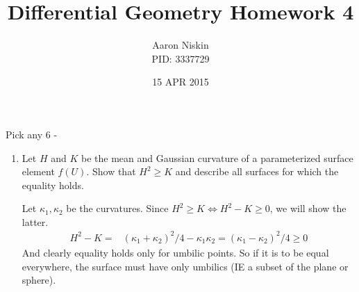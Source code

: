 \documentclass[12pt]{amsart}
\newcommand{\ka}[0]{\kappa}
\begin{document}
\title{Differential Geometry Homework 4}
\author{Aaron Niskin \\PID: 3337729}
\date{15 APR 2015}
\maketitle
Pick any 6 - 
\begin{enumerate}
	\item Let $H$ and $K$ be the mean and Gaussian curvature of a parameterized surface element $f(U)$. Show that $H^2\geq K$ and describe all surfaces for which the equality holds.

	Let $\ka_1,\ka_2$ be the curvatures. Since $H^2\geq K\iff H^2-K\geq0$, we will show the latter.
	\begin{align*}
		H^2-K=&(\ka_1+\ka_2)^2/4-\ka_1\ka_2=(\ka_1-\ka_2)^2/4\geq0
	\end{align*}
	And clearly equality holds only for umbilic points. So if it is to be equal everywhere, the surface must have only umbilics (IE a subset of the plane or sphere).


\end{enumerate}
\end{document}
